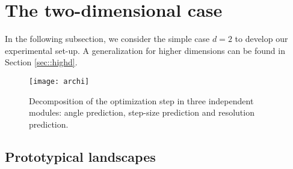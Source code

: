 {	%
			
	
\section{The two-dimensional case}
\label{sec::twod}
In the following subsection, we consider the simple case $d=2$ to develop our experimental set-up. A generalization for higher dimensions can be found in Section \ref{sec::highd}. 
		
		\begin{figure}[h!]
				\begin{center}
					\texttt{[image: archi]}
					\caption[Decomposition of the optimization step in three independent modules]{Decomposition of the optimization step in three independent modules: angle prediction, step-size prediction and resolution prediction.}
					\label{fig::archi}
				\end{center}
			\end{figure}	
			


\subsection{Prototypical landscapes}}
	
